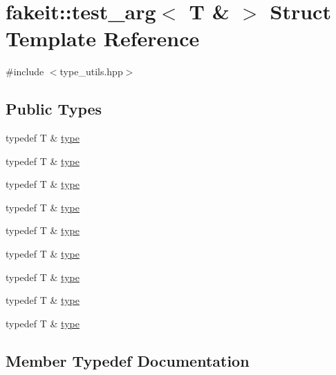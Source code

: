 \hypertarget{structfakeit_1_1test__arg_3_01T_01_6_01_4}{}\section{fakeit\+::test\+\_\+arg$<$ T \& $>$ Struct Template Reference}
\label{structfakeit_1_1test__arg_3_01T_01_6_01_4}


{\ttfamily \#include $<$type\+\_\+utils.\+hpp$>$}

\subsection*{Public Types}
\begin{DoxyCompactItemize}
\item 
typedef T \& \mbox{\hyperlink{structfakeit_1_1test__arg_3_01T_01_6_01_4_a76c42a4147d9060cc475b5496393cec4}{type}}
\item 
typedef T \& \mbox{\hyperlink{structfakeit_1_1test__arg_3_01T_01_6_01_4_a76c42a4147d9060cc475b5496393cec4}{type}}
\item 
typedef T \& \mbox{\hyperlink{structfakeit_1_1test__arg_3_01T_01_6_01_4_a76c42a4147d9060cc475b5496393cec4}{type}}
\item 
typedef T \& \mbox{\hyperlink{structfakeit_1_1test__arg_3_01T_01_6_01_4_a76c42a4147d9060cc475b5496393cec4}{type}}
\item 
typedef T \& \mbox{\hyperlink{structfakeit_1_1test__arg_3_01T_01_6_01_4_a76c42a4147d9060cc475b5496393cec4}{type}}
\item 
typedef T \& \mbox{\hyperlink{structfakeit_1_1test__arg_3_01T_01_6_01_4_a76c42a4147d9060cc475b5496393cec4}{type}}
\item 
typedef T \& \mbox{\hyperlink{structfakeit_1_1test__arg_3_01T_01_6_01_4_a76c42a4147d9060cc475b5496393cec4}{type}}
\item 
typedef T \& \mbox{\hyperlink{structfakeit_1_1test__arg_3_01T_01_6_01_4_a76c42a4147d9060cc475b5496393cec4}{type}}
\item 
typedef T \& \mbox{\hyperlink{structfakeit_1_1test__arg_3_01T_01_6_01_4_a76c42a4147d9060cc475b5496393cec4}{type}}
\end{DoxyCompactItemize}


\subsection{Member Typedef Documentation}
\mbox{\label{structfakeit_1_1test__arg_3_01T_01_6_01_4_a76c42a4147d9060cc475b5496393cec4}} 
